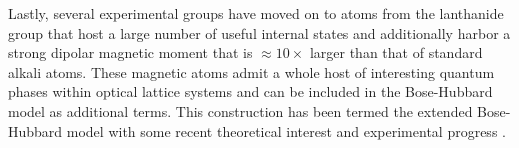 Lastly, several experimental groups have moved on to atoms from the lanthanide group that host a large number of useful internal states and additionally harbor a strong dipolar magnetic moment that is $\approx 10 \times$ larger than that of standard alkali atoms. These magnetic atoms admit a whole host of interesting quantum phases within optical lattice systems and can be included in the Bose-Hubbard model as additional terms. This construction has been termed the extended Bose-Hubbard model with some recent theoretical interest and experimental progress \cite{Dutta2015,Baier2016}.
 
 
%
%
%
%












